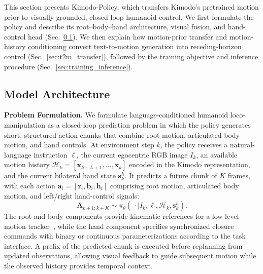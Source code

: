 This section presents Kimodo-Policy, which transfers Kimodo's pretrained motion prior to visually grounded, closed-loop humanoid control. We first formulate the policy and describe its root--body--hand architecture, visual fusion, and hand-control head (Sec.~\ref{sec:method_architecture}). We then explain how motion-prior transfer and motion-history conditioning convert text-to-motion generation into receding-horizon control (Sec.~\ref{sec:t2m_transfer}), followed by the training objective and inference procedure (Sec.~\ref{sec:training_inference}).

\subsection{Model Architecture}
\label{sec:method_architecture}

\textbf{Problem Formulation.} We formulate language-conditioned humanoid loco-manipulation as a closed-loop prediction problem in which the policy generates short, structured action chunks that combine root motion, articulated body motion, and hand controls. At environment step $k$, the policy receives a natural-language instruction $\ell$, the current egocentric RGB image $I_k$, an available motion history $\mathcal{H}_k=[\mathbf{x}_{k-L+1},\ldots,\mathbf{x}_k]$ encoded in the Kimodo representation, and the current bilateral hand state $\mathbf{s}^{h}_k$. It predicts a future chunk of $K$ frames, with each action $\mathbf{a}_i=[\mathbf{r}_i,\mathbf{b}_i,\mathbf{h}_i]$ comprising root motion, articulated body motion, and left/right hand-control signals:
\begin{equation}
  \mathbf{A}_{k+1:k+K}\sim\pi_{\theta}(\,\cdot\mid I_k,\ell,\mathcal{H}_k,\mathbf{s}^{h}_k).
  \label{eq:policy_formulation}
\end{equation}
The root and body components provide kinematic references for a low-level motion tracker~\cite{ze2025twist2scalableportableholistic,guan2026limmtmotiontracking}, while the hand component specifies synchronized closure commands with binary or continuous parameterizations according to the task interface. A prefix of the predicted chunk is executed before replanning from updated observations, allowing visual feedback to guide subsequent motion while the observed history provides temporal context.

